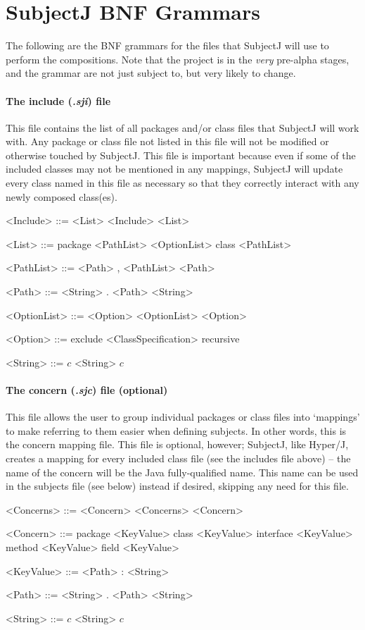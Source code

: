 \documentclass[11pt,letterpaper]{article}
\begin{document}
    \section*{SubjectJ BNF Grammars}
    The following are the BNF grammars for the files that SubjectJ will use to perform the compositions. Note that the project is in the \emph{very} pre-alpha stages, and the grammar are not just subject to, but very likely to change.
    \paragraph{The include (\emph{.sji}) file}
    This file contains the list of all packages and/or class files that SubjectJ will work with. Any package or class file not listed in this file will not be modified or otherwise touched by SubjectJ. This file is important because even if some of the included classes may not be mentioned in any mappings, SubjectJ will update every class named in this file as necessary so that they correctly interact with any newly composed class(es).
    \begin{grammar}
        <Include> ::= <List> <Include>
        \alt <List>

        <List> ::= package <PathList> <OptionList>
        \alt class <PathList>

        <PathList> ::= <Path> , <PathList>
        \alt <Path>

        <Path> ::= <String> . <Path>
        \alt <String>

        <OptionList> ::= <Option> <OptionList>
        \alt <Option>

        <Option> ::= exclude <ClassSpecification>
        \alt  recursive

        <String> ::= $c$ <String>
        \alt $c$
    \end{grammar}

    \paragraph{The concern (\emph{.sjc}) file (optional)}
    This file allows the user to group individual packages or class files into `mappings' to make referring to them easier when defining subjects. In other words, this is the concern mapping file. This file is optional, however; SubjectJ, like Hyper/J, creates a mapping for every included class file (see the includes file above) -- the name of the concern will be the Java fully-qualified name. This name can be used in the subjects file (see below) instead if desired, skipping any need for this file.
    \begin{grammar}
        <Concerns> ::= <Concern> <Concerns>
        \alt <Concern>

        <Concern> ::= package <KeyValue>
        \alt class <KeyValue>
        \alt interface <KeyValue>
        \alt method <KeyValue>
        \alt field <KeyValue>

        <KeyValue> ::= <Path> : <String>

        <Path> ::= <String> . <Path>
        \alt <String>

        <String> ::= $c$ <String>
        \alt $c$
    \end{grammar}
\end{document}
